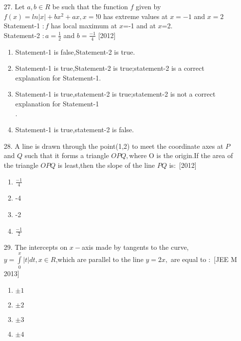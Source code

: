 \documentclass[journal,12pt,twocolumn]{IEEEtran}
\theoremstyle{remark}
\begin{document}
\begin{enumerate}
\item[27.] Let $a,b\in R$ be such that the function $f$ given by $f(x)=ln|x|+bx^{2}+ax,x=$!$0$ has extreme values at $x=-1$ and $x=2$\\
Statement-1 $: f$ has local maximum at $x$=-1 and at $x$=2.\\
Statement-2 $: a=\frac{1}{2}$ and $b=\frac{-1}{4}$ \hfill{[2012]}\\
\begin{enumerate}
    \item Statement-1 is false,Statement-2 is true.\\
    \item Statement-1 is true,Statement-2 is true;statement-2 is a correct explanation for Statement-1.\\
    \item Statement-1 is true,statement-2 is true;statement-2 is not a correct explanation for Statement-1\\.
    \item Statement-1 is true,statement-2 is false.\\
\end{enumerate}

\item[28.] A line is drawn through the point(1,2) to meet the coordinate axes at $P$ and $Q$ such that it forms a triangle $OPQ,$where O is the origin.If the area of the triangle $OPQ$ is least,then the slope of the line $PQ$ is$:$  \hfill{[2012]}\\
\begin{enumerate}
    \item  $\frac{-1}{4}$\\
    \item  -4\\
    \item  -2\\
    \item  $\frac{-1}{2}$\\
\end{enumerate}
\item[29.] The intercepts on $x-$axis made by tangents to the curve, $y=\int\limits_0^x|t|dt,x\in R$,which are parallel to the line $y=2x,$ are equal to $:$ {[JEE M 2013]}\\
\begin{enumerate}
    \item  $\pm1$\\
    \item  $\pm2$\\
    \item  $\pm3$\\
    \item  $\pm4$\\
    

\end{enumerate}
\end{enumerate}
\end{document}
